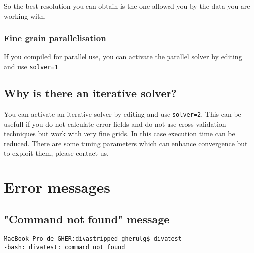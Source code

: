So the best resolution you can obtain is the one allowed you by the data you are working with.

\subsubsection{Fine grain parallelisation}

If you compiled \diva for parallel use, you can activate the parallel solver by editing  and use \texttt{solver=1}


\subsection{Why is there an iterative solver?}
You can activate an iterative solver by editing  and use \texttt{solver=2}. This can be usefull if you do not calculate error fields and do not use cross validation techniques but work with very fine grids. In this case execution time can be reduced. There are some tuning parameters which can enhance convergence but to exploit them, please contact us.



\section{Error messages}



\subsection{"Command not found" message}

\begin{lstlisting}[style=Bash]
MacBook-Pro-de-GHER:divastripped gherulg$ divatest
-bash: divatest: command not found
\end{lstlisting}


\subsubsection{\question}


